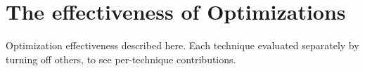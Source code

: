 \section{The effectiveness of Optimizations}


Optimization effectiveness described here. Each technique evaluated separately by turning off others, to see per-technique contributions.